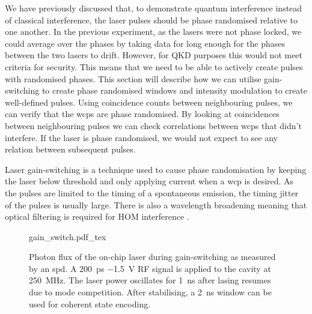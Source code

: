 We have previously discussed that, to demonstrate quantum interference instead of classical interference, the laser pulses should be phase randomised relative to one another. In the previous experiment, as the lasers were not phase locked, we could average over the phases by taking data for long enough for the phases between the two lasers to drift. However, for \ac{QKD} purposes this would not meet criteria for security. This means that we need to be able to actively create pulses with randomised phases. This section will describe how we can utilise gain-switching to create phase randomised windows and intensity modulation to create well-defined pulses. Using coincidence counts between neighbouring pulses, we can verify that the  \acp{wcp} are phase randomised. By looking at coincidences between neighbouring pulses we can check correlations between \acp{wcp} that didn't interfere. If the laser is phase randomised, we would not expect to see any relation between subsequent pulses. 


Laser gain-switching is a technique used to cause phase randomisation by keeping the laser below threshold and only applying current when a \ac{wcp} is desired. As the pulses are limited to the timing of a spontaneous emission, the timing jitter of the pulses is usually large. There is also a wavelength broadening meaning that optical filtering is required for \ac{HOM} interference \cite{Agnesi2019}. 

\begin{figure}[t]
	\centering
	\def\svgwidth{0.8\textwidth} 
	{gain_switch.pdf_tex}
	\caption[Photon flux whilst gain-switching of the on-chip lasers at \SI{250}{MHz}]{Photon flux of the on-chip laser during gain-switching as measured by an \acs{spd}. A \SI{200}{ps} \SI{-1.5}{V} RF signal is applied to the cavity at \SI{250}{MHz}. The laser power oscillates for \SI{1}{ns} after lasing resumes due to mode competition. After stabilising, a \SI{2}{ns} window can be used for coherent state encoding.}	
	\label{fig:gain_switch}
\end{figure}


